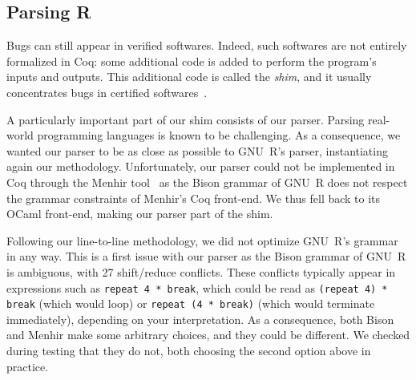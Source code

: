 \documentclass[
    sigplan,
    10pt,
    review, %
    natbib=false %
 ]{acmart}
\begin{document}
\subsection{Parsing R}
\label{sec:shim}

Bugs can still appear in verified softwares.
Indeed, such softwares are not entirely formalized in Coq:
some additional code is added to perform the program's inputs and outputs.
This additional code is called the \emph{shim},
and it usually concentrates bugs in certified softwares~\parencite{Yang:2011:FUB:1993498.1993532}.

A particularly important part of our shim consists of our parser.
Parsing real-world programming languages is known to be challenging.
As a consequence, we wanted our parser to be as close as possible to GNU~R's parser,
instantiating again our methodology.
Unfortunately, our parser could not be implemented in Coq
through the Menhir tool~\parencite{jourdan2012validating}
as the Bison grammar of GNU~R does not respect the grammar constraints
of Menhir's Coq front-end.
We thus fell back to its OCaml front-end,
making our parser part of the shim.

Following our line-to-line methodology,
we did not optimize GNU~R's grammar in any way.
This is a first issue with our parser
as the Bison grammar of GNU~R is ambiguous,
with 27 shift/reduce conflicts.
These conflicts typically appear in expressions such as
\texttt{repeat 4 * break},
which could be read as \texttt{(repeat 4) * break}
(which would loop)
or \texttt{repeat (4 * break)}
(which would terminate immediately),
depending on your interpretation.
As a consequence, both Bison and Menhir make some arbitrary choices,
and they could be different.
We checked during testing that they do not,
both choosing the second option above in practice.
\end{document}

